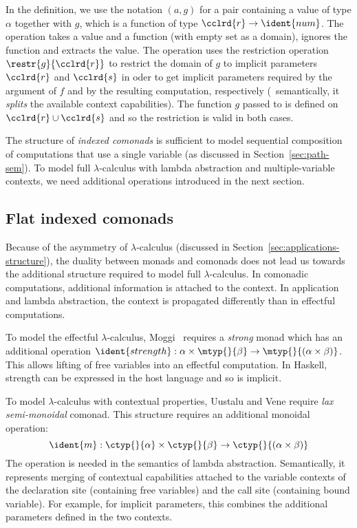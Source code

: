 \noindent
In the definition, we use the notation $(a, g)$ for a pair containing a value of type $\alpha$
together with $g$, which is a function of type $\cclrd{r} \rightarrow \ident{num}$. The  operation
takes a value and a function (with empty set as a domain), ignores the function and extracts the
value. The  operation uses the restriction operation $\restr{g}{\cclrd{r}}$ to
restrict the domain of $g$ to implicit parameters $\cclrd{r}$ and $\cclrd{s}$ in oder to get
implicit parameters required by the argument of $f$ and by the resulting computation, respectively
(\ie~semantically, it \emph{splits} the available context capabilities). The function $g$ passed
to  is defined on $\cclrd{r} \cup \cclrd{s}$ and so the restriction is
valid in both cases.

The structure of \emph{indexed comonads} is sufficient to model sequential composition of
computations that use a single variable (as discussed in Section~\ref{sec:path-sem}). To model
full $\lambda$-calculus with lambda abstraction and multiple-variable contexts, we need
additional operations introduced in the next section.


\subsection{Flat indexed comonads}
\label{sec:semantics-flat-monoidal}

Because of the asymmetry of $\lambda$-calculus (discussed in Section~\ref{sec:applications-structure}),
the duality between monads and comonads does not lead us towards the additional structure
required to model full $\lambda$-calculus. In comonadic computations, additional information is attached
to the context. In application and lambda abstraction, the context is propagated differently than
in effectful computations.

To model the effectful $\lambda$-calculus, Moggi~\cite{monad-notions} requires a \emph{strong} monad which
has an additional operation $\ident{strength} : \alpha\times\mtyp{}{\beta} \rightarrow \mtyp{}{(\alpha\times\beta)}$.
This allows lifting of free variables into an effectful computation. In Haskell, strength can be expressed
in the host language and so is implicit.

To model $\lambda$-calculus with contextual properties, Uustalu and Vene \cite{comonads-notions}
require \emph{lax semi-monoidal} comonad. This structure requires an additional monoidal operation:
%
\begin{equation*}
\ident{m} : \ctyp{}{\alpha} \times \ctyp{}{\beta} \rightarrow \ctyp{}{(\alpha \times \beta)}
\end{equation*}
%
The  operation is needed in the semantics of lambda abstraction. Semantically, it represents
merging of contextual capabilities attached to the variable contexts of the declaration site (containing free variables)
and the call site (containing bound variable). For example, for implicit parameters, this combines
the additional parameters defined in the two contexts.

